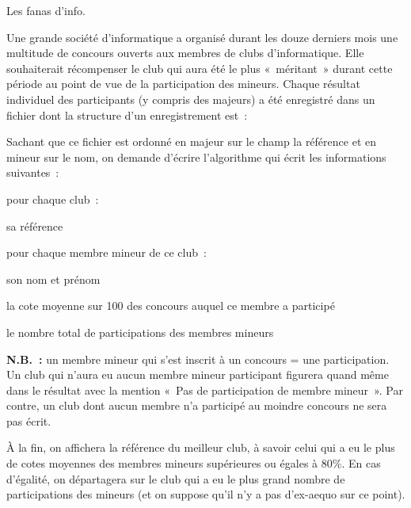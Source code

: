\begin{Exercice}{Les fanas d'info.}

	Une grande société d’informatique a organisé durant les douze derniers
	mois une multitude de concours ouverts aux membres de clubs
	d’informatique. Elle souhaiterait récompenser le club qui aura été le
	plus «~méritant~» durant cette période au point de vue de la
	participation des mineurs. Chaque résultat individuel des participants
	(y compris des majeurs) a été enregistré dans un fichier  dont
	la structure d’un enregistrement  est~:


	Sachant que ce fichier est ordonné en majeur sur le champ la référence
	et en mineur sur le nom, on demande d’écrire l’algorithme qui écrit les
	informations suivantes~:

	pour chaque club~:

	\liststyleListv
	\begin{liste}
		\item 
			sa référence
		\item 
			pour chaque membre mineur de ce club~:
		\item 
			son nom et prénom
		\item 
				la cote moyenne sur 100 des concours auquel ce membre a participé
		\item 
			le nombre total de participations des membres mineurs
	\end{liste}
	
	\textbf{N.B.~: }un membre mineur qui s’est inscrit à un concours = une
	participation. Un club qui n’aura eu aucun membre mineur participant
	figurera quand même dans le résultat avec la mention «~Pas de
	participation de membre mineur~». Par contre, un club dont aucun membre
	n’a participé au moindre concours ne sera pas écrit.

	À la fin, on affichera la référence du meilleur club, à savoir celui qui
	a eu le plus de cotes moyennes des membres mineurs supérieures ou
	égales à 80\%. En cas d’égalité, on départagera sur le club qui a eu le
	plus grand nombre de participations des mineurs (et on suppose qu’il
	n’y a pas d’ex-aequo sur ce point). 
\end{Exercice}

